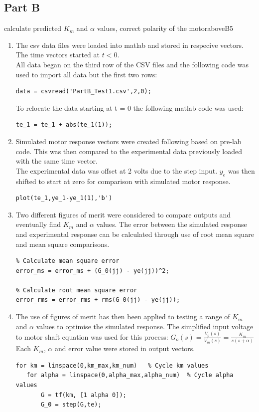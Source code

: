\documentclass[11pt,a4paper]{article}
\begin{document}
\subsection{Part B}
calculate predicted $K_m$ and $\alpha$ values, correct polarity of the motoraboveB5
\begin{enumerate}
	\item
	The csv data files were loaded into matlab and stored in respecive vectors.	The time vectors started at $t < 0$.\\ 
	All data began on the third row of the CSV files and the following code was used to import all data but the first two rows:
	\begin{lstlisting}
data = csvread('PartB_Test1.csv',2,0);
	\end{lstlisting}
	To relocate the data starting at t = 0 the following matlab code was used:
	\begin{lstlisting}
te_1 = te_1 + abs(te_1(1));
	\end{lstlisting} 

	\item Simulated motor response vectors were created following based on pre-lab code. This was then compared to the experimental data previously loaded with the same time vector.\\
	The experimental data was offset at 2 volts due to the step input. $y_e$ was then shifted to start at zero for comparison with simulated motor response.
	\begin{lstlisting}
plot(te_1,ye_1-ye_1(1),'b')
	\end{lstlisting}

	\item Two different figures of merit were considered to compare outputs and eventually find $K_m$ and $\alpha$ values. The error between the simulated response and experimental response can be calculated through use of root mean square and mean square comparisons.
	\begin{lstlisting}
% Calculate mean square error
error_ms = error_ms + (G_0(jj) - ye(jj))^2;

% Calculate root mean square error
error_rms = error_rms + rms(G_0(jj) - ye(jj));
	\end{lstlisting}
\pagebreak
	\item The use of figures of merit has then been applied to testing a range of $K_m$ and $\alpha$ values to optimise the simulated response. The simplified input voltage to motor shaft equation was used for this process: $G_o(s) = \frac{V_p(s)}{V_m(s)} = \frac{K_m}{s(s + \alpha)}$ \\
	Each $K_m$, $\alpha$ and error value were stored in output vectors.
	\begin{lstlisting}
for km = linspace(0,km_max,km_num)   % Cycle km values
   for alpha = linspace(0,alpha_max,alpha_num)  % Cycle alpha values
       G = tf(km, [1 alpha 0]);
       G_0 = step(G,te);


\end{lstlisting}
\end{enumerate}
\end{document}
